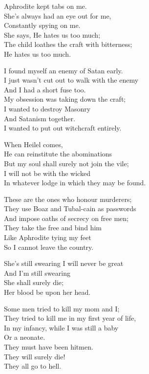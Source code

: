 \documentclass[
]{book}
\begin{document}
Aphrodite kept tabs on me.\\
She's always had an eye out for me,\\
Constantly spying on me.\\
She says, He hates us too much;\\
The child loathes the craft with bitterness;\\
He hates us too much.

I found myself an enemy of Satan early.\\
I just wasn't cut out to walk with the enemy\\
And I had a short fuse too.\\
My obsession was taking down the craft;\\
I wanted to destroy Masonry\\
And Satanism together.\\
I wanted to put out witchcraft entirely.

When Heilel comes,\\
He can reinstitute the abominations\\
But my soul shall surely not join the vile;\\
I will not be with the wicked\\
In whatever lodge in which they may be found.

These are the ones who honour murderers;\\
They use Boaz and Tubal-cain as passwords\\
And impose oaths of secrecy on free men;\\
They take the free and bind him\\
Like Aphrodite tying my feet\\
So I cannot leave the country.

She's still swearing I will never be great\\
And I'm still swearing\\
She shall surely die;\\
Her blood be upon her head.

Some men tried to kill my mom and I;\\
They tried to kill me in my first year of life,\\
In my infancy, while I was still a baby\\
Or a neonate.\\
They must have been hitmen.\\
They will surely die!\\
They all go to hell.
\end{document}
